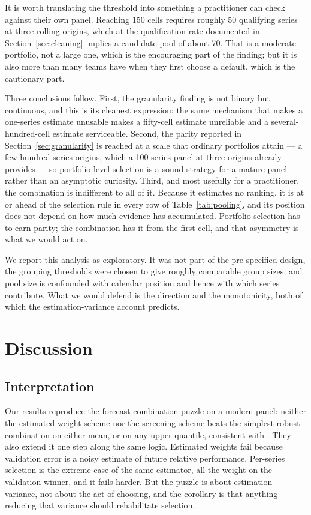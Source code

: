 \documentclass[11pt]{article}
\begin{document}
It is worth translating the threshold into something a practitioner can check against their own panel. Reaching 150 cells requires roughly 50 qualifying series at three rolling origins, which at the qualification rate documented in Section~\ref{sec:cleaning} implies a candidate pool of about 70. That is a moderate portfolio, not a large one, which is the encouraging part of the finding; but it is also more than many teams have when they first choose a default, which is the cautionary part.

Three conclusions follow. First, the granularity finding is not binary but continuous, and this is its cleanest expression: the same mechanism that makes a one-series estimate unusable makes a fifty-cell estimate unreliable and a several-hundred-cell estimate serviceable. Second, the parity reported in Section~\ref{sec:granularity} is reached at a scale that ordinary portfolios attain --- a few hundred series-origins, which a 100-series panel at three origins already provides --- so portfolio-level selection is a sound strategy for a mature panel rather than an asymptotic curiosity. Third, and most usefully for a practitioner, the combination is indifferent to all of it. Because it estimates no ranking, it is at or ahead of the selection rule in every row of Table~\ref{tab:pooling}, and its position does not depend on how much evidence has accumulated. Portfolio selection has to earn parity; the combination has it from the first cell, and that asymmetry is what we would act on.

We report this analysis as exploratory. It was not part of the pre-specified design, the grouping thresholds were chosen to give roughly comparable group sizes, and pool size is confounded with calendar position and hence with which series contribute. What we would defend is the direction and the monotonicity, both of which the estimation-variance account predicts.

\section{Discussion}

\subsection{Interpretation}

Our results reproduce the forecast combination puzzle on a modern panel: neither the estimated-weight scheme nor the screening scheme beats the simplest robust combination on either mean, or on any upper quantile, consistent with \citet{smith2009}. They also extend it one step along the same logic. Estimated weights fail because validation error is a noisy estimate of future relative performance. Per-series selection is the extreme case of the same estimator, all the weight on the validation winner, and it fails harder. But the puzzle is about estimation variance, not about the act of choosing, and the corollary is that anything reducing that variance should rehabilitate selection.
\end{document}

